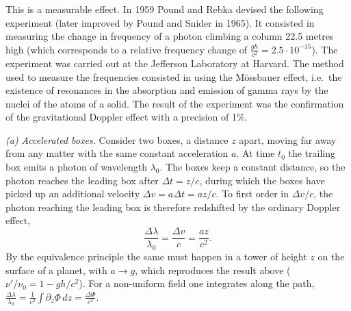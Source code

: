 \begin{points}
\item This is a measurable effect. In 1959 Pound and Rebka devised the following experiment (later improved by Pound and Snider in 1965). It consisted in measuring the change in frequency of a photon climbing a column 22.5 metres high (which corresponds to a relative frequency change of $\frac{gh}{c^2}=2.5\cdot10^{-15}$). The experiment was carried out at the Jefferson Laboratory at Harvard. The method used to measure the frequencies consisted in using the Mössbauer effect, i.e.\ the existence of resonances in the absorption and emission of gamma rays by the nuclei of the atoms of a solid. The result of the experiment was the confirmation of the gravitational Doppler effect with a precision of 1\%.

\begin{carroll}
\textit{(a) Accelerated boxes.} Consider two boxes, a distance $z$ apart, moving far away from any matter with the same constant acceleration $a$. At time $t_0$ the trailing box emits a photon of wavelength $\lambda_0$. The boxes keep a constant distance, so the photon reaches the leading box after $\Delta t=z/c$, during which the boxes have picked up an additional velocity $\Delta v=a\Delta t=az/c$. To first order in $\Delta v/c$, the photon reaching the leading box is therefore redshifted by the ordinary Doppler effect,
\[
  \frac{\Delta\lambda}{\lambda_0}=\frac{\Delta v}{c}=\frac{az}{c^2}.
\]
By the equivalence principle the same must happen in a tower of height $z$ on the surface of a planet, with $a\to g$, which reproduces the result above ($\nu'/\nu_0=1-gh/c^2$). For a non-uniform field one integrates along the path, $\frac{\Delta\lambda}{\lambda_0}=\frac{1}{c^2}\int\partial_z\Phi\,dz=\frac{\Delta\Phi}{c^2}$.
\begin{center}
\end{center}
\end{carroll}
\end{points}
